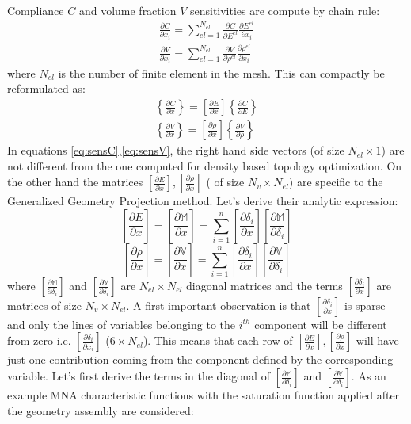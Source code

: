 Compliance $C$ and volume fraction $V$ sensitivities are compute by chain rule:
\begin{eqnarray}
\frac{\partial C}{\partial x_i}=\sum_{el=1}^{N_{el}}{\frac{\partial C}{\partial E^{el}}\frac{\partial E^{el}}{\partial x_i}}\\
\frac{\partial V}{\partial x_i}=\sum_{el=1}^{N_{el}}{\frac{\partial V}{\partial \rho^{el}}\frac{\partial \rho^{el}}{\partial x_i}}
\end{eqnarray}
where $N_{el}$ is the number of finite element in the mesh. This can compactly be reformulated as:
\begin{eqnarray}
\label{eq:sensC}
\left\lbrace\frac{\partial C}{\partial x}\right\rbrace=\left[\frac{\partial E}{\partial x}\right]\left\lbrace\frac{\partial C}{\partial E}\right\rbrace\\
\left\lbrace\frac{\partial V}{\partial x}\right\rbrace=\left[\frac{\partial \rho}{\partial x}\right]\left\lbrace\frac{\partial V}{\partial\rho}\right\rbrace
\label{eq:sensV}
\end{eqnarray}
In equations \eqref{eq:sensC},\eqref{eq:sensV}, the right hand side vectors (of size $N_{el}\times 1$) are not different from the one computed for density based topology optimization. On the other hand the matrices $\left[\frac{\partial E}{\partial x}\right],\left[\frac{\partial \rho}{\partial x}\right]$ ( of size $N_v\times N_{el}$) are specific to the Generalized Geometry Projection method.  Let's derive their analytic expression:
\begin{equation}
    \left[\frac{\partial E}{\partial x}\right]=\left[\frac{\partial \mathbb{M}}{\partial x}\right]=\sum_{i=1}^n{\left[\frac{\partial \delta_i}{\partial x}\right]\left[\frac{\partial \mathbb{M}}{\partial \delta_i}\right]}
\end{equation}
\begin{equation}
    \left[\frac{\partial \rho}{\partial x}\right]=\left[\frac{\partial \mathbb{V}}{\partial x}\right]=\sum_{i=1}^n{\left[\frac{\partial \delta_i}{\partial x}\right]\left[\frac{\partial \mathbb{V}}{\partial \delta_i}\right]}
\end{equation}
where $\left[\frac{\partial \mathbb{M}}{\partial \delta_i}\right]$ and $\left[\frac{\partial \mathbb{V}}{\partial \delta_i}\right]$ are $N_{el}\times N_{el}$ diagonal matrices and the terms $\left[\frac{\partial \delta_i}{\partial x}\right]$ are matrices of size  $N_v\times N_{el}$. A first important observation is that $\left[\frac{\partial \delta_i}{\partial x}\right]$ is sparse and only the lines of variables belonging to the $i^{th}$ component will be different from zero i.e. $\left[\frac{\partial \delta_i}{\partial x_i}\right]$ ($6\times N_{el}$). This means that each row of $\left[\frac{\partial E}{\partial x}\right],\left[\frac{\partial \rho}{\partial x}\right]$ will have just one contribution coming from the component defined by the corresponding variable. Let's first derive the terms in the diagonal of $\left[\frac{\partial \mathbb{M}}{\partial \delta_i}\right]$ and $\left[\frac{\partial \mathbb{V}}{\partial \delta_i}\right]$. As an example MNA characteristic functions with the saturation function applied after the geometry assembly are considered:
